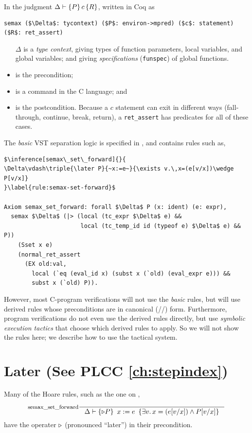 \documentclass[12pt,fleqn,openany,oneside,showtrims]{memoir}
\newcommand{\ychapter}[2]{\chapter[#1]{#1 \hfill \normalsize #2}}
\begin{document}
In the judgment $\Delta\vdash\{P\}\,c\,\{R\}$, written in Coq as
\begin{lstlisting}
semax ($\Delta$: tycontext) ($P$: environ->mpred) ($c$: statement) ($R$: ret_assert)
\end{lstlisting}
\vspace*{-\baselineskip}
\begin{itemize}
\item[$\Delta$] is a \emph{type context}, giving types of function parameters, local variables, and global variables; and giving \emph{specifications} (\lstinline{funspec}) of global functions.
\item[$P$] is the precondition;
\item[$c$] is a command in the C language; and
\item[$R$] is the postcondition.  Because a $c$ statement can exit in different ways (fall-through, continue, break, return), a \lstinline{ret_assert}
has predicates for all of these cases.
\end{itemize}

The \emph{basic} VST separation logic is specified in , and contains rules such as,\label{refcard:later1}
\begin{lstlisting}
$\inference[semax\_set\_forward]{}{
\Delta\vdash\triple{\later P}{~x:=e~}{\exists v.\,x=(e[v/x])\wedge P[v/x]}
}\label{rule:semax-set-forward}$

Axiom semax_set_forward: forall $\Delta$ P (x: ident) (e: expr),
  semax $\Delta$ (|> (local (tc_expr $\Delta$ e) &&
                      local (tc_temp_id id (typeof e) $\Delta$ e) && P))
    (Sset x e)
    (normal_ret_assert
      (EX old:val,
        local (`eq (eval_id x) (subst x (`old) (eval_expr e))) &&
        subst x (`old) P)).
\end{lstlisting}

However, most C-program verifications will not use the \emph{basic} rules, but will use derived rules whose preconditions are in canonical
(\PROP/\LOCAL/\SEP) form.  Furthermore, program verifications
do not even use the derived rules directly, but use
\emph{symbolic execution tactics} that choose which derived rules to apply.
So we will not show the rules here; we describe how to use
the tactical system.

\ychapter{Later}{(See PLCC \autoref{ch:stepindex})}
Many of the Hoare rules, such as the one on ,
\[\inference[semax\_set\_forward]{}{
\Delta\vdash\triple{\later P}{~x:=e~}{\exists v.\,x=(e[v/x])\wedge P[v/x]}
}\label{rule:semax-set-forward}\]
have the operater $\triangleright$ (pronounced ``later'') in their precondition.
\end{document}
